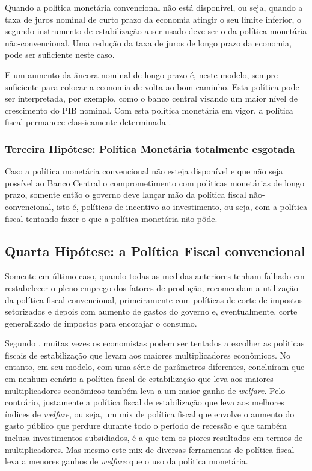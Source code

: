 \documentclass[
	10pt,				%
	openright,			%
	twoside,			%
	a5paper,			%
	english,			%
	french,				%
	spanish,			%
	brazil				%
	]{abntex2}
\renewenvironment{quote}
  {\small\list{}{\rightmargin=0.1cm \leftmargin=4cm}%
   \item\relax}
  {\endlist}
\begin{document}
Quando a política monetária convencional não está disponível, ou seja,
quando a taxa de juros nominal de curto prazo da economia atingir o seu
limite inferior, o segundo instrumento de estabilização a ser usado deve
ser o da política monetária não-convencional. Uma redução da taxa de
juros de longo prazo da economia, pode ser suficiente neste caso.

\begin{quote}
E um aumento da âncora nominal de longo prazo é, neste modelo, sempre
suficiente para colocar a economia de volta ao bom caminho. Esta
política pode ser interpretada, por exemplo, como o banco central
visando um maior nível de crescimento do PIB nominal. Com esta política
monetária em vigor, a política fiscal permanece classicamente
determinada \cite[p.33]{mankiw2011}.
\end{quote}

\subsubsection{Terceira Hipótese: Política Monetária totalmente
esgotada}\label{terceira-hipuxf3tese-poluxedtica-monetuxe1ria-totalmente-esgotada}

Caso a política monetária convencional não esteja disponível e que não
seja possível ao Banco Central o comprometimento com políticas
monetárias de longo prazo, somente então o governo deve lançar mão da
política fiscal não-convencional, isto é, políticas de incentivo ao
investimento, ou seja, com a política fiscal tentando fazer o que a
política monetária não pôde.

\subsection{Quarta Hipótese: a Política Fiscal
convencional}\label{quarta-hipuxf3tese-a-poluxedtica-fiscal-convencional}

Somente em último caso, quando todas as medidas anteriores tenham
falhado em restabelecer o pleno-emprego dos fatores de produção,
 recomendam a utilização da política
fiscal convencional, primeiramente com políticas de corte de impostos
setorizados e depois com aumento de gastos do governo e, eventualmente,
corte generalizado de impostos para encorajar o consumo.

Segundo , muitas vezes os economistas
podem ser tentados a escolher as políticas fiscais de estabilização que
levam aos maiores multiplicadores econômicos. No entanto, em seu modelo,
com uma série de parâmetros diferentes, 
concluíram que em nenhum cenário a política fiscal de estabilização que
leva aos maiores multiplicadores econômicos também leva a um maior ganho
de \emph{welfare}. Pelo contrário, justamente a política fiscal de
estabilização que leva aos melhores índices de \emph{welfare}, ou seja,
um mix de política fiscal que envolve o aumento do gasto público que
perdure durante todo o período de recessão e que também inclusa
investimentos subsidiados, é a que tem os piores resultados em termos de
multiplicadores. Mas mesmo este mix de diversas ferramentas de política
fiscal leva a menores ganhos de \emph{welfare} que o uso da política
monetária.
\end{document}
